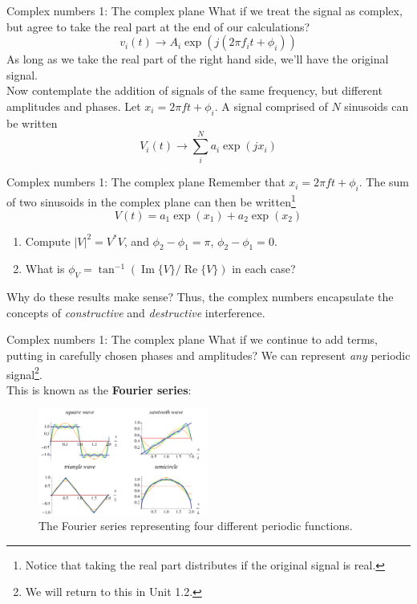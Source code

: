 \documentclass{beamer}
\begin{document}
\begin{frame}{Complex numbers 1: The complex plane}
What if we treat the signal as complex, but agree to take the real part at the end of our calculations?
\begin{equation}
v_i(t) \rightarrow A_i \exp(j(2\pi f_i t + \phi_i))
\end{equation}
As long as we take the real part of the right hand side, we'll have the original signal. \\ \vspace{0.5cm}
Now contemplate the addition of signals of the same frequency, but different amplitudes and phases.  Let $x_i = 2\pi ft+\phi_i$.  A signal comprised of $N$ sinusoids can be written
\begin{equation}
V_i(t) \rightarrow \sum_i^N a_i \exp(jx_i)
\end{equation}
\end{frame}

\begin{frame}{Complex numbers 1: The complex plane}
Remember that $x_i = 2\pi ft+\phi_i$.  The sum of two sinusoids in the complex plane can then be written\footnote{Notice that taking the real part distributes if the original signal is real.}
\begin{equation}
V(t) = a_1\exp(x_1) + a_2\exp(x_2)
\end{equation}
\begin{enumerate}
\item Compute $|V|^2 = V^*V$, and $\phi_2 - \phi_1 = \pi$, $\phi_2 - \phi_1 = 0$.
\item What is $\phi_V = \tan^{-1}(\operatorname{Im}\lbrace V \rbrace/\operatorname{Re}\lbrace V \rbrace)$ in each case?
\end{enumerate}
Why do these results make sense?  Thus, the complex numbers encapsulate the concepts of \textit{constructive} and \textit{destructive} interference.
\end{frame}

\begin{frame}{Complex numbers 1: The complex plane}
\small
What if we continue to add terms, putting in carefully chosen phases and amplitudes?  We can represent \textit{any} periodic signal\footnote{We will return to this in Unit 1.2.}.  \\ \vspace{0.5cm}
This is known as the \textbf{\alert{Fourier series}}:
\begin{figure}
\centering
\includegraphics[width=0.5\textwidth]{figures/Fourier_Series.png}
\caption{\label{fig:fourier} The Fourier series representing four different periodic functions.}
\end{figure}
\end{frame}
\end{document}
